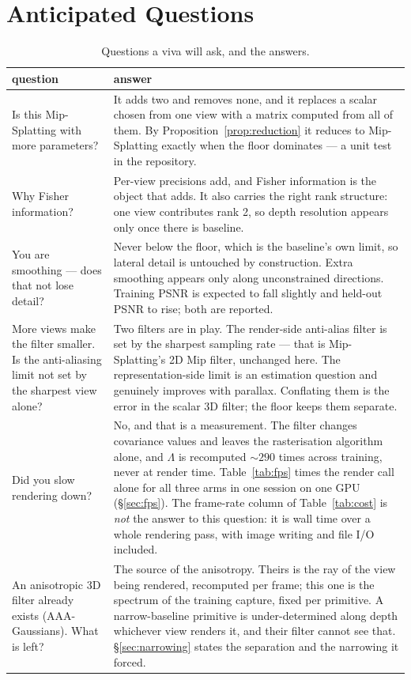 \section{Anticipated Questions}

\begin{table}[htbp]
  \centering
  \caption{Questions a viva will ask, and the answers.}
  \small
  \begin{tabularx}{\linewidth}{L{0.78}L{1.22}}
    \toprule
    question & answer \\
    \midrule
    Is this Mip-Splatting with more parameters? & It adds two and removes none, and it replaces a scalar chosen from one view with a matrix computed from all of them. By Proposition~\ref{prop:reduction} it reduces to Mip-Splatting exactly when the floor dominates --- a unit test in the repository. \\
    Why Fisher information? & Per-view precisions add, and Fisher information is the object that adds. It also carries the right rank structure: one view contributes rank 2, so depth resolution appears only once there is baseline. \\
    You are smoothing --- does that not lose detail? & Never below the floor, which is the baseline's own limit, so lateral detail is untouched by construction. Extra smoothing appears only along unconstrained directions. Training PSNR is expected to fall slightly and held-out PSNR to rise; both are reported. \\
    More views make the filter smaller. Is the anti-aliasing limit not set by the sharpest view alone? & Two filters are in play. The render-side anti-alias filter is set by the sharpest sampling rate --- that is Mip-Splatting's 2D Mip filter, unchanged here. The representation-side limit is an estimation question and genuinely improves with parallax. Conflating them is the error in the scalar 3D filter; the floor keeps them separate. \\
    Did you slow rendering down? & No, and that is a measurement. The filter changes covariance values and leaves the rasterisation algorithm
    alone, and $\Lambda$ is recomputed ${\sim}290$ times across training, never at render time. Table~\ref{tab:fps} times the render call alone for all three arms in one session on one GPU (\S\ref{sec:fps}). The frame-rate column of Table~\ref{tab:cost} is \emph{not} the answer to this question: it is wall time over a whole rendering pass, with image writing and file I/O included. \\
    An anisotropic 3D filter already exists (AAA-Gaussians). What is left? & The source of the anisotropy. Theirs is the ray of the view being rendered, recomputed per frame; this one is the spectrum of the training capture, fixed per primitive. A narrow-baseline primitive is under-determined along depth whichever view renders it, and their filter cannot see that. \S\ref{sec:narrowing} states the separation and the narrowing it forced. \\

\end{tabularx}
\end{table}
